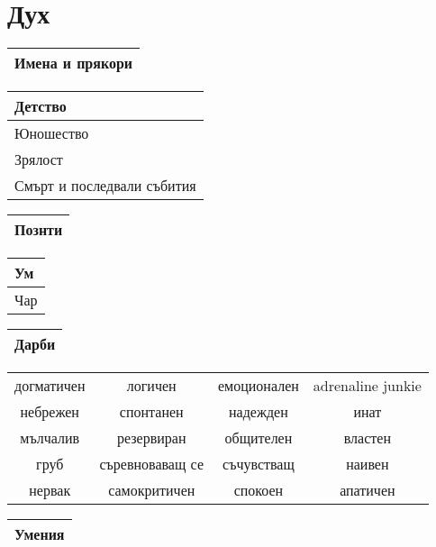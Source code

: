 \documentclass{article}
\begin{document}
\section{Дух}
\extrarowsep=0.5cm
\noindent
\begin{tabular}{|p{\textwidth}|}
\hline
{\tiny Имена и прякори}  \\
\hline
\end{tabular}

\begin{multicols}{2}
\extrarowsep=2.5cm
\noindent
\begin{tabular}{|p{}|}
\hline
{\tiny Детство}  \\
\hline
{\tiny Юношество}  \\
\hline
{\tiny Зрялост}  \\
\hline
{\tiny Смърт и последвали събития}  \\
\hline
\end{tabular}

\extrarowsep=11.5cm
\noindent
\begin{tabular}{|p{}|}
\hline
{\tiny Познти}  \\
\hline
\end{tabular}
\end{multicols}

\begin{multicols}{2}
\extrarowsep=1cm
\begin{tabular}{|p{2cm}|}
\hline
{\tiny Ум}  \\
\hline
{\tiny Чар}  \\
\hline
\end{tabular}

\extrarowsep=4cm
\begin{tabular}{|p{4cm}|}
\hline
{\tiny Дарби}  \\
\hline
\end{tabular}

\begin{tiny}
\extrarowsep=0.5cm
\noindent
\begin{tabular}{|c c c c|}
\hline
догматичен & логичен & емоционален & adrenaline junkie  \\
небрежен & спонтанен & надежден & инат  \\
мълчалив & резервиран & общителен & властен  \\
груб & съревноваващ се & съчувстващ & наивен  \\
нервак & самокритичен & спокоен & апатичен  \\
\hline
\end{tabular}
\end{tiny}

\extrarowsep=12cm
\noindent
\begin{tabular}{|p{6cm}|}
\hline
{\tiny Умения}  \\
\hline
\end{tabular}
\end{multicols}
\end{document}
